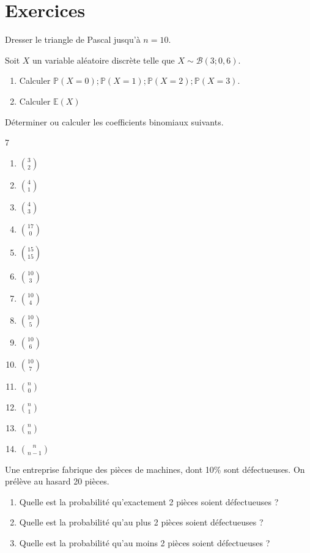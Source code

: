 \documentclass[french]{book}
\begin{document}
\newpage

\section{Exercices}

\begin{exocor}
Dresser le triangle de Pascal jusqu'à $n=10$.
\end{exocor}

\begin{exocor}
Soit $X$ un variable aléatoire discrète telle que $X\sim \mathcal{B}(3;0,6)$.

\begin{enumerate}
\item Calculer $\mathbb{P}(X=0);\mathbb{P}(X=1);\mathbb{P}(X=2);\mathbb{P}(X=3)$.
\item Calculer $\mathbb{E}(X)$
\end{enumerate}
\end{exocor}

\begin{exocor}
Déterminer ou calculer les coefficients binomiaux suivants.
\begin{multicols}{7}
\begin{enumerate}
\item $\binom{3}{2}$
\item $\binom{4}{1}$
\item $\binom{4}{3}$
\item $\binom{17}{0}$
\item $\binom{15}{15}$
\item $\binom{10}{3}$
\item $\binom{10}{4}$
\item $\binom{10}{5}$
\item $\binom{10}{6}$
\item $\binom{10}{7}$
\item $\binom{n}{0}$
\item $\binom{n}{1}$
\item $\binom{n}{n}$
\item $\binom{n}{n-1}$
\end{enumerate}
\end{multicols}
\end{exocor}

\begin{exocor}
Une entreprise fabrique des pièces de machines, dont 10\% sont défectueuses. On prélève au hasard 20 pièces.

\begin{enumerate}
\item Quelle est la probabilité qu'exactement 2 pièces soient défectueuses ?
\item Quelle est la probabilité qu'au plus 2 pièces soient défectueuses ?
\item Quelle est la probabilité qu'au moins 2 pièces soient défectueuses ?
\end{enumerate}
\end{exocor}
\end{document}

